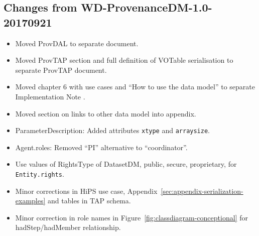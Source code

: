 \documentclass[11pt,a4paper]{ivoa}
\newcommand{\attribute}[1]{\texttt{#1}}
\begin{document}
\begin{appendices}
\subsection{Changes from WD-ProvenanceDM-1.0-20170921}
\begin{itemize}
\item Moved ProvDAL to separate document.
\item Moved ProvTAP section and full definition of VOTable serialisation to separate ProvTAP document.
\item Moved chapter 6 with use cases and ``How to use the data model'' to  separate Implementation Note \citep{std:ProvenanceImplementationNote}.
\item Moved section on links to other data model into appendix.
\item ParameterDescription: Added attributes \attribute{xtype} and \attribute{arraysize}.
\item Agent.roles: Removed ``PI'' alternative to ``coordinator''.
\item Use values of RightsType of DatasetDM, public, secure, proprietary, for \attribute{Entity.rights}.
\item Minor corrections in HiPS use case, Appendix~\ref{sec:appendix-serialization-examples} and tables in TAP schema.
\item Minor correction in role names in Figure~\ref{fig:classdiagram-conceptional} for hadStep/hadMember relationship.
\end{itemize}


\end{appendices}
\end{document}
